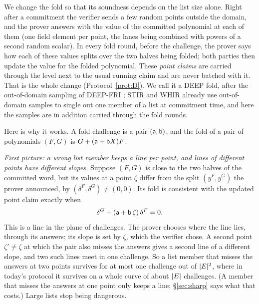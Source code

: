 We change the fold so that its soundness depends on the list size alone. Right after a commitment the verifier sends a few random points outside the domain, and the prover answers with the value of the committed polynomial at each of them (one field element per point, the lanes being combined with powers of a second random scalar). In every fold round, before the challenge, the prover says how each of these values splits over the two halves being folded; both parties then update the value for the folded polynomial. These \emph{point claims} are carried through the level next to the usual running claim and are never batched with it. That is the whole change (Protocol~\ref{prot:D}). We call it a DEEP fold, after the out-of-domain sampling of DEEP-FRI \cite{BGKS20}; STIR and WHIR \cite{ACFY24,ACFY25} already use out-of-domain samples to single out one member of a list at commitment time, and here the samples are in addition carried through the fold rounds.

Here is why it works. A fold challenge is a pair $(\mathsf{a},\mathsf{b})$, and the fold of a pair of polynomials $(F,G)$ is $G+(\mathsf{a}+\mathsf{b} X)F$.

\emph{First picture: a wrong list member keeps a line per point, and lines of different points have different slopes.} Suppose $(F,G)$ is close to the two halves of the committed word, but its values at a point $\zeta$ differ from the split $(y^F,y^G)$ the prover announced, by $(\delta^F,\delta^G)\ne(0,0)$. Its fold is consistent with the updated point claim exactly when
\[
\delta^G+(\mathsf{a}+\mathsf{b}\,\zeta)\,\delta^F=0 .
\]
This is a line in the plane of challenges. The prover chooses where the line lies, through its answers; its slope is set by $\zeta$, which the verifier chose. A second point $\zeta'\ne\zeta$ at which the pair also misses the answers gives a second line of a different slope, and two such lines meet in one challenge. So a list member that misses the answers at two points survives for at most one challenge out of $|E|^2$, where in today's protocol it survives on a whole curve of about $|E|$ challenges. (A member that misses the answers at one point only keeps a line; \S\ref{sec:sharp} says what that costs.) Large lists stop being dangerous.

